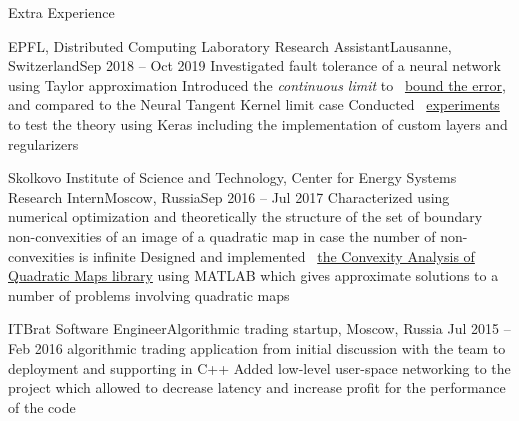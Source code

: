 \documentclass{resume} %
\newcommand*{\img}[1]{%
	\raisebox{-.02\baselineskip}{%
		\texttt{[image: \#1]}%
	}%
}
\newcommand*{\emoji}[1]{\img{./emoji/\imgpref#1.png}}
\newcommand*{\mybold}[1]{{\color{pinkunderline} #1}}
\def\imgpref{bleak-}
\newcommand{\mylink}{{\color{gray}\faExternalLink}}
\begin{document}
\begin{rSection}{Extra Experience}
	\begin{rSubsection}{EPFL, Distributed Computing Laboratory \emoji{flag-ch}}{Research Assistant}{Lausanne, Switzerland}{Sep 2018 -- Oct 2019}
		\myitem Investigated \mybold{fault tolerance} of a neural network using \mybold{Taylor approximation}
		\myitem Introduced the {\em continuous limit} to \mylink~\href{https://arxiv.org/abs/1902.01686}{bound the error}, and compared to the Neural Tangent Kernel limit case
		\myitem Conducted \mylink~\href{https://github.com/LPD-EPFL/ProbabilisticFaultToleranceNNs}{experiments} to test the theory using \mybold{Keras} including the \mybold{implementation} of custom layers and regularizers
	\end{rSubsection}

	\begin{rSubsection}{Skolkovo Institute of Science and Technology, Center for Energy Systems \emoji{flag-ru}}{Research Intern}{Moscow, Russia}{Sep 2016 -- Jul 2017}
	\myitem Characterized using \mybold{numerical optimization} and \mybold{theoretically} the structure of the set of boundary non-convexities of an image of a quadratic map in case the number of non-convexities is infinite
	\myitem Designed and implemented \mylink~\href{https://github.com/sergeivolodin/CAQM}{the Convexity Analysis of Quadratic Maps \mybold{library}} using \mybold{MATLAB} which gives approximate solutions to a number of problems involving quadratic maps
   \end{rSubsection}

	\begin{rSubsection}{ITBrat \emoji{stocks}}{Software Engineer}{Algorithmic trading startup, Moscow, Russia \emoji{flag-ru}}{Jul 2015 -- Feb 2016}
		\myitem \mybold{Developed} algorithmic trading application from initial discussion with the team to deployment and supporting in \mybold{C++}
		\myitem Added low-level user-space networking to the project which allowed to decrease latency and increase profit
		\myitem \mybold{Responsible} for the performance of the code
	\end{rSubsection}
\end{rSection}
\end{document}
